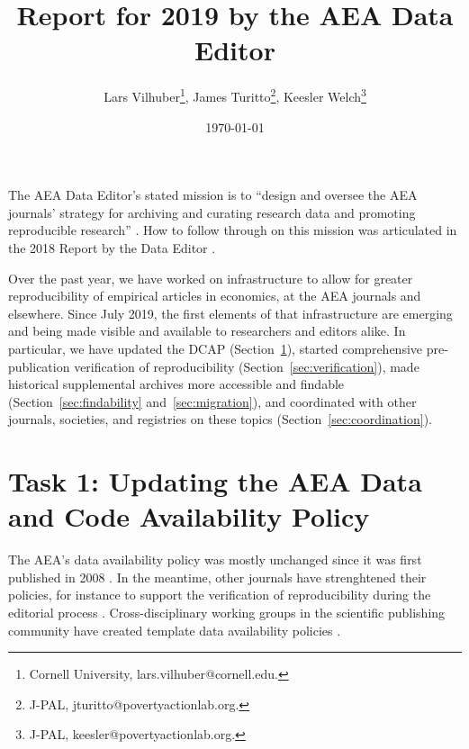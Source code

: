 \documentclass[PP]{AEA}
\begin{document}
\title{Report for 2019 by the AEA Data Editor }
\author{Lars Vilhuber\thanks{%
Cornell University, lars.vilhuber@cornell.edu. },
 James Turitto\thanks{%
J-PAL, jturitto@povertyactionlab.org.},
Keesler Welch\thanks{%
J-PAL, keesler@povertyactionlab.org.}
}
\date{\today}
\pubVolume{--}
\pubIssue{--}
\JEL{}




\maketitle

The \ac{AEA} Data Editor's stated mission is to ``design  and  oversee  the  AEA  journals’  strategy for archiving and curating research data and promoting  reproducible  research'' \citep{10.1257/pandp.108.745}. How to follow through on this mission was articulated in the 2018 Report by the Data Editor \citep{10.1257/pandp.109.718}.

Over the past year, we have worked on infrastructure to allow for greater reproducibility of empirical articles in economics, at the \ac{AEA} journals and elsewhere. Since July 2019, the first elements of that infrastructure  are   emerging and being made visible and available to researchers and editors alike. In particular, we have updated the \ac{DCAP} (Section~\ref{sec:dcap}), started comprehensive pre-publication verification of reproducibility (Section~\ref{sec:verification}), made historical supplemental archives more accessible and findable (Section~\ref{sec:findability} and~\ref{sec:migration}), and coordinated with other journals, societies, and registries on these topics (Section~\ref{sec:coordination}).



\section{Task 1: Updating the AEA Data and Code Availability Policy}
\label{sec:dcap}

The \ac{AEA}'s data availability policy was mostly unchanged since it was first published in 2008 \citep{American_Economic_Association2008-wayback}. In the meantime, other journals have strenghtened their policies, for instance to support the verification of reproducibility during the editorial process \citep{JacobyInsideHigherEd2017,Christian2018}. Cross-disciplinary working groups in the scientific publishing community have created template data availability policies \citep{HrynaszkiewiczInt.J.Digit.Curation2017}. 
\end{document}
